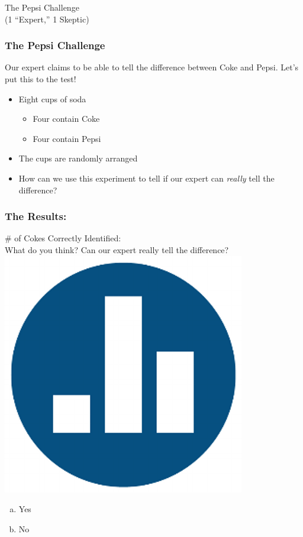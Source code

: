 \documentclass[handout]{beamer}
\begin{document}
\begin{frame}
\begin{center}
\Huge The Pepsi Challenge \\
	\large (1 ``Expert,'' 1 Skeptic)
\end{center}
\end{frame}
\begin{frame}
\frametitle{The Pepsi Challenge}
Our expert claims to be able to tell the difference between Coke and Pepsi. Let's put this to the test! 
\begin{itemize}
\item Eight cups of soda 
	\begin{itemize}
\item Four contain Coke 
\item Four contain Pepsi 
\end{itemize}
	\item The cups are randomly arranged 
	\item How can we use this experiment to tell if our expert can \emph{\alert{really}} tell the difference?
\end{itemize}
\end{frame}
\begin{frame}
\frametitle{The Results:}
	\# of Cokes Correctly Identified: \\ \vspace{2em}
	\alert{What do you think? Can our expert really tell the difference? \includegraphics[scale = 0.05]{./images/clicker}}
		\begin{enumerate}[(a)]
\item Yes
\item No
\end{enumerate}
\end{frame}
\end{document}
